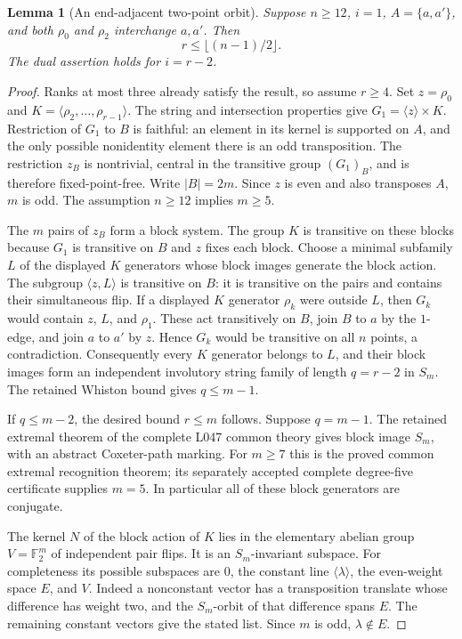 \documentclass[11pt,a4paper]{article}
\newtheorem{lemma}{Lemma}
\newcommand{\gen}[1]{\langle#1\rangle}
\begin{document}
\begin{lemma}[An end-adjacent two-point orbit]
Suppose $n\geq12$, $i=1$, $A=\{a,a'\}$, and both $\rho_0$
and $\rho_2$ interchange $a,a'$. Then
\[
                         r\leq\lfloor(n-1)/2\rfloor.
\]
The dual assertion holds for $i=r-2$.
\end{lemma}
\begin{proof}
Ranks at most three already satisfy the result, so assume $r\geq4$.
Set $z=\rho_0$ and $K=\gen{\rho_2,\ldots,\rho_{r-1}}$.
The string and intersection properties give
$G_1=\gen z\times K$. Restriction of $G_1$ to $B$ is faithful:
an element in its kernel is supported on $A$, and the only possible
nonidentity element there is an odd transposition. The restriction
$z_B$ is nontrivial, central in the transitive group $(G_1)_B$,
and is therefore fixed-point-free. Write $|B|=2m$. Since $z$ is
even and also transposes $A$, $m$ is odd. The assumption $n\geq12$
implies $m\geq5$.

The $m$ pairs of $z_B$ form a block system. The group $K$ is
transitive on these blocks because $G_1$ is transitive on $B$ and
$z$ fixes each block. Choose a minimal subfamily $L$ of the displayed
$K$ generators whose block images generate the block action.
The subgroup $\gen{z,L}$ is transitive on $B$: it is transitive
on the pairs and contains their simultaneous flip. If a displayed
$K$ generator $\rho_k$ were outside $L$, then $G_k$ would contain
$z$, $L$, and $\rho_1$. These act transitively on $B$, join $B$ to
$a$ by the $1$-edge, and join $a$ to $a'$ by $z$. Hence $G_k$
would be transitive on all $n$ points, a contradiction. Consequently
every $K$ generator belongs to $L$, and their block images form an
independent involutory string family of length $q=r-2$ in $S_m$.
The retained Whiston bound gives $q\leq m-1$.

If $q\leq m-2$, the desired bound $r\leq m$ follows. Suppose
$q=m-1$. The retained extremal theorem of the complete L047 common
theory gives block image $S_m$, with an abstract Coxeter-path marking.
For $m\geq7$ this is the proved common extremal recognition theorem;
its separately accepted complete degree-five certificate supplies
$m=5$. In particular all of these block generators are conjugate.

The kernel $N$ of the block action of $K$ lies in the elementary
abelian group $V=\mathbb F_2^m$ of independent pair flips. It is an
$S_m$-invariant subspace. For completeness its possible subspaces
are $0$, the constant line $\gen\lambda$, the even-weight space
$E$, and $V$. Indeed a nonconstant vector has a transposition
translate whose difference has weight two, and the $S_m$-orbit of
that difference spans $E$. The remaining constant vectors give the
stated list. Since $m$ is odd, $\lambda\notin E$.


\end{proof}
\end{document}
